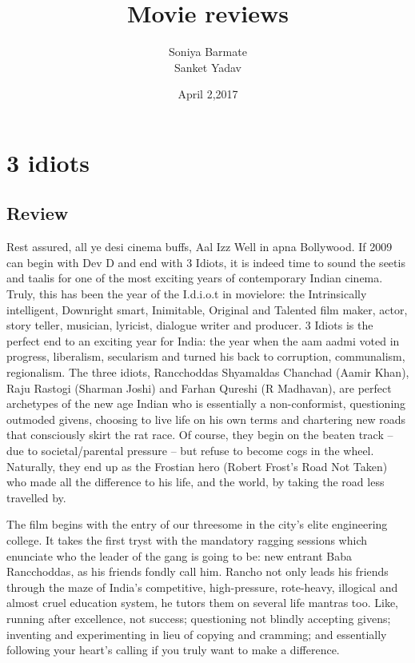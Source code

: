 \documentclass[11pt]{article}
\begin{document}
 

\title{Movie reviews}
\author{Soniya Barmate\\Sanket Yadav}
\date{April 2,2017}
\maketitle

\section*{3 idiots}
\subsection*{Review}
Rest assured, all ye desi cinema buffs, Aal Izz Well in apna Bollywood. If 2009 can begin with Dev D and end with 3 Idiots, it is indeed time to sound the seetis and taalis for one of the most exciting years of contemporary Indian cinema. Truly, this has been the year of the I.d.i.o.t in movielore: the Intrinsically intelligent, Downright smart, Inimitable, Original and Talented film maker, actor, story teller, musician, lyricist, dialogue writer and producer.
3 Idiots is the perfect end to an exciting year for India: the year when the aam aadmi voted in progress, liberalism, secularism and turned his back to corruption, communalism, regionalism. The three idiots, Rancchoddas Shyamaldas Chanchad (Aamir Khan), Raju Rastogi (Sharman Joshi) and Farhan Qureshi (R Madhavan), are perfect archetypes of the new age Indian who is essentially a non-conformist, questioning outmoded givens, choosing to live life on his own terms and chartering new roads that consciously skirt the rat race. Of course, they begin on the beaten track -- due to societal/parental pressure -- but refuse to become cogs in the wheel. Naturally, they end up as the Frostian hero (Robert Frost's Road Not Taken) who made all the difference to his life, and the world, by taking the road less travelled by.

The film begins with the entry of our threesome in the city's elite engineering college. It takes the first tryst with the mandatory ragging sessions which enunciate who the leader of the gang is going to be: new entrant Baba Rancchoddas, as his friends fondly call him. Rancho not only leads his friends through the maze of India's competitive, high-pressure, rote-heavy, illogical and almost cruel education system, he tutors them on several life mantras too. Like, running after excellence, not success; questioning not blindly accepting givens; inventing and experimenting in lieu of copying and cramming; and essentially following your heart's calling if you truly want to make a difference.
\end{document}
